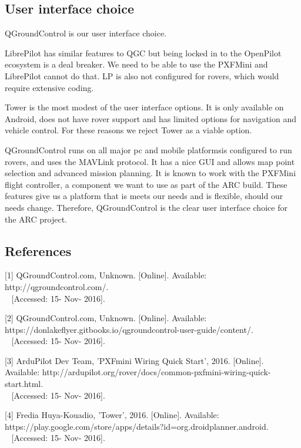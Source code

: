 \documentclass[compsoc,draftclsnofoot,onecolumn,10pt]{IEEEtran}
\begin{document}
\subsection{User interface choice}
QGroundControl is our user interface choice.\par
LibrePilot has similar features to QGC but being locked in to the OpenPilot
ecosystem is a deal breaker. We need to be able to use the PXFMini and
LibrePilot cannot do that. LP is also not configured for rovers, which would
require extensive coding.\par
Tower is the most modest of the user interface options. It is only available on
Android, does not have rover support and has limited options for navigation and
vehicle control. For these reasons we reject Tower as a viable option.\par
QGroundControl runs on all major pc and mobile platformsis configured to run
rovers, and uses the MAVLink protocol. It has a nice GUI and allows map point
selection and advanced mission planning. It is known to work with the PXFMini
flight controller, a component we want to use as part of the ARC build. These
features give us a platform that is meets our needs and is flexible, should our
needs change. Therefore, QGroundControl is the clear user interface choice for
the ARC project.

\subsection{References}

[1] QGroundControl.com, Unknown. [Online]. Available: http://qgroundcontrol.com/.\\~
[Accessed: 15- Nov- 2016].\par

[2] QGroundControl.com, Unknown. [Online]. 
Available: https://donlakeflyer.gitbooks.io/qgroundcontrol-user-guide/content/.\\~
[Accessed: 15- Nov- 2016].\par

[3] ArduPilot Dev Team, 'PXFmini Wiring Quick Start', 2016. [Online]. 
Available: http://ardupilot.org/rover/docs/common-pxfmini-wiring-quick-start.html.\\~
[Accessed: 15- Nov- 2016].\par

[4] Fredia Huya-Kouadio, 'Tower', 2016. [Online]. 
Available: https://play.google.com/store/apps/details?id=org.droidplanner.android.\\~
[Accessed: 15- Nov- 2016].\par
\end{document}
